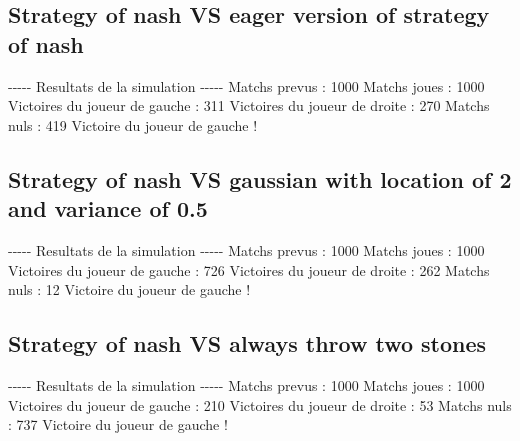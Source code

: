 \documentclass{article}%
\begin{document}
%
\subsection{Strategy of nash VS eager version of strategy of nash}%
\label{subsec:Strategy of nash VS eager version of strategy of nash}%
{-}{-}{-}{-}{-} Resultats de la simulation {-}{-}{-}{-}{-}\newline%
		\newline%
Matchs prevus : 1000\newline%
Matchs joues : 1000\newline%
\newline%
Victoires du joueur de gauche : 311\newline%
Victoires du joueur de droite : 270\newline%
Matchs nuls : 419\newline%
\newline%
Victoire du joueur de gauche !

%
\subsection{Strategy of nash VS gaussian with location of 2 and variance of 0.5}%
\label{subsec:Strategy of nash VS gaussian with location of 2 and variance of 0.5}%
{-}{-}{-}{-}{-} Resultats de la simulation {-}{-}{-}{-}{-}\newline%
		\newline%
Matchs prevus : 1000\newline%
Matchs joues : 1000\newline%
\newline%
Victoires du joueur de gauche : 726\newline%
Victoires du joueur de droite : 262\newline%
Matchs nuls : 12\newline%
\newline%
Victoire du joueur de gauche !

%
\subsection{Strategy of nash VS always throw two stones}%
\label{subsec:Strategy of nash VS always throw two stones}%
{-}{-}{-}{-}{-} Resultats de la simulation {-}{-}{-}{-}{-}\newline%
		\newline%
Matchs prevus : 1000\newline%
Matchs joues : 1000\newline%
\newline%
Victoires du joueur de gauche : 210\newline%
Victoires du joueur de droite : 53\newline%
Matchs nuls : 737\newline%
\newline%
Victoire du joueur de gauche !
\end{document}

